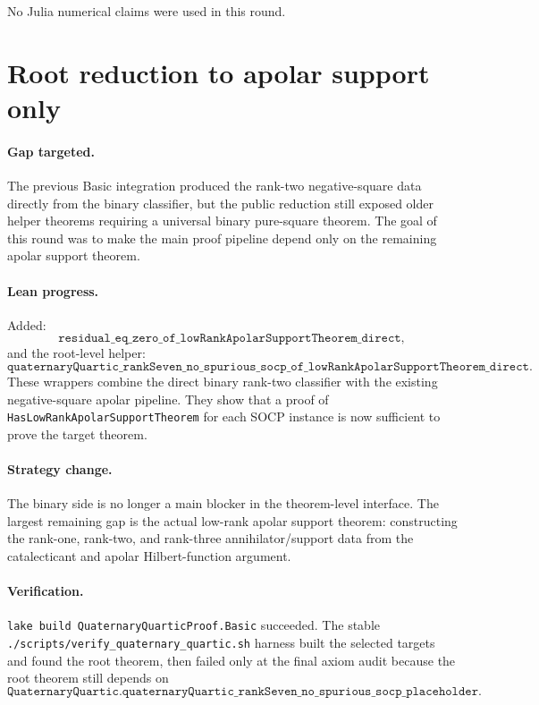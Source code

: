 \documentclass[11pt]{article}
\begin{document}
No Julia numerical claims were used in this round.

\section*{Root reduction to apolar support only}

\paragraph{Gap targeted.}
The previous Basic integration produced the rank-two negative-square data
directly from the binary classifier, but the public reduction still exposed
older helper theorems requiring a universal binary pure-square theorem.  The
goal of this round was to make the main proof pipeline depend only on the
remaining apolar support theorem.

\paragraph{Lean progress.}
Added:
\[
\texttt{residual\_eq\_zero\_of\_lowRankApolarSupportTheorem\_direct},
\]
and the root-level helper:
\[
\texttt{quaternaryQuartic\_rankSeven\_no\_spurious\_socp\_of\_lowRankApolarSupportTheorem\_direct}.
\]
These wrappers combine the direct binary rank-two classifier with the existing
negative-square apolar pipeline.  They show that a proof of
\texttt{HasLowRankApolarSupportTheorem} for each SOCP instance is now
sufficient to prove the target theorem.

\paragraph{Strategy change.}
The binary side is no longer a main blocker in the theorem-level interface.
The largest remaining gap is the actual low-rank apolar support theorem:
constructing the rank-one, rank-two, and rank-three annihilator/support data
from the catalecticant and apolar Hilbert-function argument.

\paragraph{Verification.}
\texttt{lake build QuaternaryQuarticProof.Basic} succeeded.  The stable
\texttt{./scripts/verify\_quaternary\_quartic.sh} harness built the selected
targets and found the root theorem, then failed only at the final axiom audit
because the root theorem still depends on
\[
\texttt{QuaternaryQuartic.quaternaryQuartic\_rankSeven\_no\_spurious\_socp\_placeholder}.
\]
\end{document}
